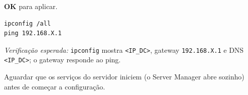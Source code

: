 \textbf{OK} para aplicar.

\begin{lstlisting}[style=psstyle]
ipconfig /all
ping 192.168.X.1
\end{lstlisting}

\emph{Verificação esperada:} \texttt{ipconfig} mostra \texttt{\textless{}IP\_DC\textgreater{}}, gateway \texttt{192.168.X.1} e DNS \texttt{\textless{}IP\_DC\textgreater{}}; o gateway responde ao ping.


Aguardar que os serviços do servidor iniciem (o Server Manager abre sozinho) antes de começar a configuração.

